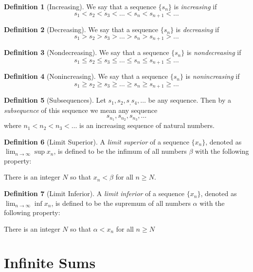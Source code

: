 \documentclass[11pt]{article}
\newcommand{\set}[1]{\{#1\}}
\def \limsup {\lim_{n \to \infty} \sup}
\def \liminf {\lim_{n \to \infty} \inf}
\def \sn {s_n}
\def \snplusone {s_{n+1}}
\def \seqsn{ \set{\sn} }
\def \xn {x_n}
\theoremstyle{definition}
\newtheorem{definition}{Definition}[section]
\begin{document}
\setcounter{definition}{23}
\begin{definition} [Increasing]
	We say that a sequence $ \seqsn $ is \textit{increasing} if $$ s_1 < s_2 < s_3 < \dots < \sn < s_{n+1} < \dots $$
\end{definition}


\begin{definition} [Decreasing]
	We say that a sequence $ \seqsn $ is \textit{decreasing} if	$$ s_1 > s_2 > s_3 > \dots > s_n > \snplusone > \dots $$
\end{definition}


\begin{definition} [Nondecreasing]
	We say that a sequence $ \seqsn $ is \textit{nondecreasing} if $$ s_1 \leq s_2 \leq s_3 \leq \dots \leq \sn \leq \snplusone \leq \dots$$
\end{definition}


\begin{definition} [Nonincreasing]
	We say that a sequence $ \seqsn $ is \textit{nonincreasing} if $$ s_1 \geq s_2 \geq s_3 \geq \dots \geq \sn \geq \snplusone \geq \dots $$
\end{definition}

\setcounter{definition}{36}
\begin{definition} [Subsequences]
	Let $ s_1, s_2, s_, s_4, \dots $ be any sequence. Then by a \textit{subsequence} of this sequence we mean any sequence $$s_{n_1}, s_{n_2}, s_{n_3}, \dots$$ where $n_1 < n_2 < n_3 < \dots$ is an increasing sequence of natural numbers.
\end{definition}

\setcounter{definition}{43}
\begin{definition} [Limit Superior]
	A \textit{limit superior} of a sequence $\set{\xn}$, denoted as	$\limsup \xn$, is defined to be the infimum of all numbers $ \beta $ with the following property:
	
	There is an integer $ N $ so that $ \xn < \beta $ for all $ n \geq N $.
\end{definition}

\begin{definition} [Limit Inferior]
	A \textit{limit inferior} of a sequence $\set{\xn}$, denoted as	$\liminf \xn$, is defined to be the supremum of all numbers $ \alpha $ with the following property:
	
	There is an integer $ N $ so that $ \alpha  < \xn$ for all $ n \geq N $
\end{definition}

\section{Infinite Sums}
\end{document}
